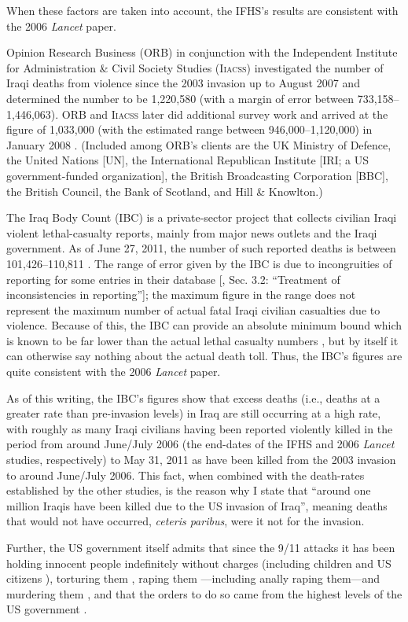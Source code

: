 \documentclass[letterpaper,12pt]{article}
\begin{document}
{\begin{quote}
\end{quote} When these factors are taken into account, the IFHS's results are consistent with the 2006 \emph{Lancet} paper.\par
    Opinion Research Business (ORB) in conjunction with the Independent Institute for Administration \& Civil Society Studies (\textsc{Iiacss}) investigated the number of Iraqi deaths from violence since the 2003 invasion up to August 2007 \cite{ORB2007-9} and determined the number to be 1,220,580 (with a margin of error between 733,158--1,446,063). ORB and \textsc{Iiacss} later did additional survey work and arrived at the figure of 1,033,000 (with the estimated range between 946,000--1,120,000) in January 2008 \cite{ORB2008-1}. (Included among ORB's clients are the UK Ministry of Defence, the United Nations [UN], the International Republican Institute [IRI; a US government-funded organization], the British Broadcasting Corporation [BBC], the British Council, the Bank of Scotland, and Hill \& Knowlton.)\par
    The Iraq Body Count (IBC) is a private-sector project that collects civilian Iraqi violent lethal-casualty reports, mainly from major news outlets and the Iraqi government. As of June 27, 2011, the number of such reported deaths is between 101,426--110,811 \cite{IBCDatabase}. The range of error given by the IBC is due to incongruities of reporting for some entries in their database [, Sec. 3.2: ``Treatment of inconsistencies in reporting'']; the maximum figure in the range does not represent the maximum number of actual fatal Iraqi civilian casualties due to violence. Because of this, the IBC can provide an absolute minimum bound which is known to be far lower than the actual lethal casualty numbers \cite{SieglerEtAl2008}, but by itself it can otherwise say nothing about the actual death toll. Thus, the IBC's figures are quite consistent with the 2006 \emph{Lancet} paper.\par
    As of this writing, the IBC's figures show that excess deaths (i.e., deaths at a greater rate than pre-invasion levels) in Iraq are still occurring at a high rate, with roughly as many Iraqi civilians having been reported violently killed in the period from around June\slash July 2006 (the end-dates of the IFHS and 2006 \emph{Lancet} studies, respectively) to May 31, 2011 as have been killed from the 2003 invasion to around June\slash July 2006. This fact, when combined with the death-rates established by the other studies, is the reason why I state that ``around one million Iraqis have been killed due to the US invasion of Iraq'', meaning deaths that would not have occurred, \emph{ceteris paribus}, were it not for the invasion.} Further, the US government itself admits that since the 9/11 attacks it has been holding innocent people indefinitely without charges (including children and US citizens \cite{Apuzzo2008,HRW2005,Markon2005}), torturing them \cite{Isikoff2005,Mayer2005,Reuters2006-4-26,RiechmannFlaherty2006}, raping them \cite{Buncombe2004,Straub2004,Taguba2004}---including anally raping them---and murdering them \cite{BBC2003,Campbell2003,Jehl2005}, and that the orders to do so came from the highest levels of the US government \cite{Bravin2004,Buncombe2005,Watts2006}.
\end{document}
